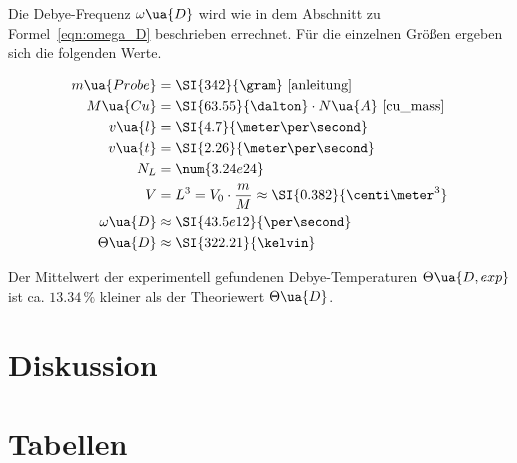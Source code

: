Die Debye-Frequenz $\omega\ua{D}$ wird wie in dem Abschnitt zu Formel~\eqref{eqn:omega_D}
beschrieben errechnet.
Für die einzelnen Größen ergeben sich die folgenden Werte.

\begin{align*}
  m\ua{Probe} &= \SI{342}{\gram} \text{~\cite{anleitung}}\\
  M\ua{Cu} &= \SI{63.55}{\dalton}\cdot N\ua{A} \text{~\cite{cu_mass}}\\
  v\ua{l} &= \SI{4.7}{\meter\per\second}\\
  v\ua{t} &= \SI{2.26}{\meter\per\second}\\
  N_L &= \num{3.24e24} \\
  V &= L^3 = V_0\cdot\frac{m}{M}\approx \SI{0.382}{\centi\meter^3}\\
  \omega\ua{D} &\approx \SI{43.5e12}{\per\second}\\
  \Theta\ua{D} &\approx \SI{322.21}{\kelvin}
\end{align*}

Der Mittelwert der experimentell gefundenen Debye-Temperaturen $\Theta\ua{D, exp}$ ist ca. $\num{13.34}\,\%$ kleiner als der Theoriewert $\Theta\ua{D}$.

\section{Diskussion}
\label{sec:diskussion}



\section{Tabellen}
\label{sec:tabellen}
\pagestyle{empty}



